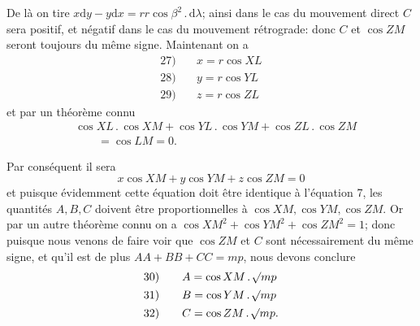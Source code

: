 \par De là on tire \(x\mathrm{d}y-y\mathrm{d}x=rr\cos\beta^2\mathbin{.}\mathrm{d}\lambda\); ainsi dans le cas du mouvement direct \(C\) sera positif, et négatif dans le cas du mouvement rétrograde: donc \(C\) et \(\cos ZM\) seront toujours du même signe. Maintenant on a
\[
\begin{array}{rl}
27)\quad&x=r\cos XL\\[4pt]
28)\quad&y=r\cos YL\\[4pt]
29)\quad&z=r\cos ZL
\end{array}
\]
et par un théorème connu
\[
\begin{aligned}
&\cos XL\mathbin{.}\cos XM+\cos YL\mathbin{.}\cos YM+\cos ZL\mathbin{.}\cos ZM\\
&\qquad=\cos LM=0.
\end{aligned}
\]
\par Par conséquent il sera
\[
x\cos XM+y\cos YM+z\cos ZM=0
\]
et puisque évidemment cette équation doit être identique à l’équation 7, les quantités \(A,B,C\) doivent être proportionnelles à \(\cos XM,\cos YM,\cos ZM\). Or par un autre théorème connu on a \(\cos XM^2+\cos YM^2+\cos ZM^2=1\); donc puisque nous venons de faire voir que \(\cos ZM\) et \(C\) sont nécessairement du même signe, et qu’il est de plus \(AA+BB+CC=mp\), nous devons conclure
\[
\begin{array}{rl}
30)\quad&A=\cos XM\mathbin{.}\mathord{{}^{}\!\surd}mp\\[4pt]
31)\quad&B=\cos YM\mathbin{.}\mathord{{}^{}\!\surd}mp\\[4pt]
32)\quad&C=\cos ZM\mathbin{.}\mathord{{}^{}\!\surd}mp.
\end{array}
\]
